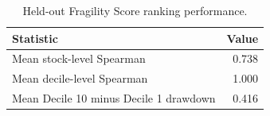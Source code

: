 \begin{table}
\caption{Held-out Fragility Score ranking performance.}
\label{tab:fragility-score-summary}
\begin{tabular}{lr}
\toprule
Statistic & Value \\
\midrule
Mean stock-level Spearman & 0.738 \\
Mean decile-level Spearman & 1.000 \\
Mean Decile 10 minus Decile 1 drawdown & 0.416 \\
\bottomrule
\end{tabular}
\end{table}
